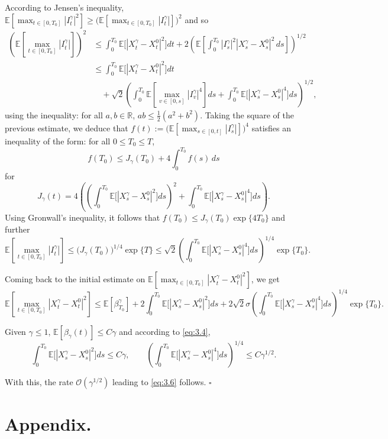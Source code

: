 \documentclass[11pt]{article}
\theoremstyle{remark}
\begin{document}
According to Jensen's inequality, $\mathbb{E}[\max_{t\in[0,T_0]}|I_t^{\gamma}|^2]\ge \bigl(\mathbb{E}[\max_{t\in[0,T_0]}|I_t^{\gamma}|]\bigr)^2$ and so
\[
\begin{aligned}
\left(\mathbb{E}\left[\max_{t\in[0,T_0]}|I_t^{\gamma}|\right]\right)^2
&\le \int_0^{T_0}\mathbb{E}\bigl[|X_t^{\gamma}-X_t^0|^2\bigr]dt+2\left(\mathbb{E}\left[\int_0^{T_0}|I_s^{\gamma}|^2|X_s^{\gamma}-X_s^0|^2\,ds\right]\right)^{1/2} \\
&\le \int_0^{T_0}\mathbb{E}\bigl[|X_t^{\gamma}-X_t^0|^2\bigr]dt \\
&\quad +\sqrt{2}\left(\int_0^{T_0}\mathbb{E}\left[\max_{v\in[0,s]}|I_v^{\gamma}|^4\right]ds+\int_0^{T_0}\mathbb{E}\bigl[|X_s^{\gamma}-X_s^0|^4\bigr]ds\right)^{1/2},
\end{aligned}
\]
using the inequality: for all $a,b\in\mathbb{R}$, $ab\le \tfrac12(a^2+b^2)$.
Taking the square of the previous estimate, we deduce that
$f(t):=\bigl(\mathbb{E}[\max_{s\in[0,t]}|I_s^{\gamma}|]\bigr)^4$ satisfies an inequality of the form: for all $0\le T_0\le T$,
\[
f(T_0)\le J_{\gamma}(T_0)+4\int_0^{T_0}f(s)\,ds
\]
for
\[
J_{\gamma}(t)=4\left(\left(\int_0^{T_0}\mathbb{E}\bigl[|X_s^{\gamma}-X_s^0|^2\bigr]ds\right)^2+\int_0^{T_0}\mathbb{E}\bigl[|X_s^{\gamma}-X_s^0|^4\bigr]ds\right).
\]
Using Gronwall's inequality, it follows that $f(T_0)\le J_{\gamma}(T_0)\exp\{4T_0\}$ and further
\[
\mathbb{E}\left[\max_{t\in[0,T_0]}|I_t^{\gamma}|\right]
\le \bigl(J_{\gamma}(T_0)\bigr)^{1/4}\exp\{T\}
\le \sqrt{2}\left(\int_0^{T_0}\mathbb{E}\bigl[|X_s^{\gamma}-X_s^0|^4\bigr]ds\right)^{1/4}\exp\{T_0\}.
\]

Coming back to the initial estimate on $\mathbb{E}[\max_{t\in[0,T_0]}|X_t^{\gamma}-X_t^0|^2]$, we get
\[
\mathbb{E}\left[\max_{t\in[0,T_0]}|X_t^{\gamma}-X_t^0|^2\right]
\le \mathbb{E}[\beta_{T_0}^{\gamma}]
+2\int_0^{T_0}\mathbb{E}\bigl[|X_s^{\gamma}-X_s^0|^2\bigr]ds
+2\sqrt{2}\sigma\left(\int_0^{T_0}\mathbb{E}\bigl[|X_s^{\gamma}-X_s^0|^4\bigr]ds\right)^{1/4}\exp\{T_0\}.
\]

Given $\gamma\le1$, $\mathbb{E}[\beta_{\gamma}(t)]\le C\gamma$ and according to \eqref{eq:3.4},
\[
\int_0^{T_0}\mathbb{E}\bigl[|X_s^{\gamma}-X_s^0|^2\bigr]ds\le C\gamma,
\qquad
\left(\int_0^{T_0}\mathbb{E}\bigl[|X_s^{\gamma}-X_s^0|^4\bigr]ds\right)^{1/4}\le C\gamma^{1/2}.
\]

With this, the rate $\mathcal{O}(\gamma^{1/2})$ leading to \eqref{eq:3.6} follows. \hfill $\square$


\section{Appendix.}
\end{document}

